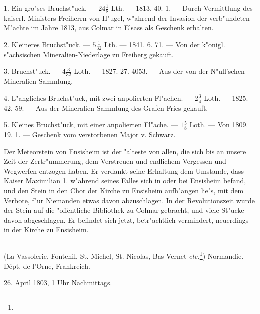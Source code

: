 \documentclass[a4paper, 11pt, oneside, polutonikogreek, german]{article}
\begin{document}
1. Ein gro"ses Bruchst"uck. --- $\mathfrak{24\frac{1}{8}}$ Lth. --- 1813. 40. 1. --- Durch Vermittlung des kaiserl. Ministers Freiherrn von H"ugel, w"ahrend der Invasion der verb"undeten M"achte im Jahre 1813, aus Colmar in Elsass als Geschenk erhalten.

2. Kleineres Bruchst"uck. --- $\mathfrak{5\frac{1}{32}}$ Lth. --- 1841. 6. 71. --- Von der k"onigl. s"achsischen Mineralien-Niederlage zu Freiberg gekauft.

3. Bruchst"uck. --- $\mathfrak{4\frac{3}{32}}$ Loth. --- 1827. 27. 4053.
--- Aus der von der N"ull’schen Mineralien-Sammlung.

4. L"angliches Bruchst"uck, mit zwei anpolierten Fl"achen. --- $\mathfrak{2\frac{3}{4}}$ Loth. --- 1825. 42. 59. --- Aus der Mineralien-Sammlung des Grafen Fries gekauft.

5. Kleines Bruchst"uck, mit einer anpolierten Fl"ache. --- $\mathfrak{1\frac{5}{8}}$ Loth. --- Von 1809. 19. 1. --- Geschenk vom verstorbenen Major v. Schwarz.

\setlength{\leftskip}{10mm}
\setlength{\parindent}{0pt}

{\footnotesize Der Meteorstein von Ensisheim ist der "alteste von allen, die sich bis an unsere Zeit der Zertr"ummerung, dem Verstreuen und endlichem Vergessen und Wegwerfen entzogen haben. Er verdankt seine Erhaltung dem Umstande, dass Kaiser Maximilian 1. w"ahrend seines Falles sich in oder bei Ensisheim befand, und den Stein in den Chor der Kirche zu Ensisheim aufh"angen lie"s, mit dem Verbote, f"ur Niemanden etwas davon abzuschlagen. In der Revolutionszeit wurde der Stein auf die "offentliche Bibliothek zu Colmar gebracht, und viele St"ucke davon abgeschlagen. Er befindet sich jetzt, betr"achtlich vermindert, neuerdings in der Kirche zu Ensisheim.}

\setlength{\leftskip}{0pt}
\setlength{\parindent}{20pt}

\subsection{}
\begin{center}

(La Vassolerie, Fontenil, St. Michel, St. Nicolas, Bas-Vernet \emph{etc.}\footnote{}) Normandie. Dépt. de l'Orne, Frankreich.

26. April 1803, 1 Uhr Nachmittags.
\end{center}
\end{document}
